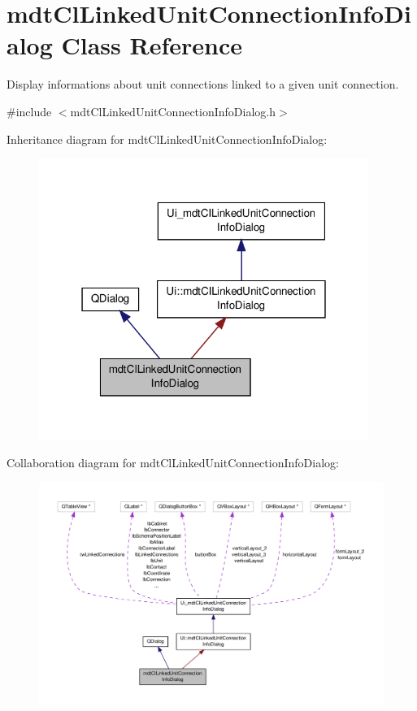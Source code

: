 \hypertarget{classmdt_cl_linked_unit_connection_info_dialog}{\section{mdt\-Cl\-Linked\-Unit\-Connection\-Info\-Dialog Class Reference}
\label{classmdt_cl_linked_unit_connection_info_dialog}
}


Display informations about unit connections linked to a given unit connection.  




{\ttfamily \#include $<$mdt\-Cl\-Linked\-Unit\-Connection\-Info\-Dialog.\-h$>$}



Inheritance diagram for mdt\-Cl\-Linked\-Unit\-Connection\-Info\-Dialog\-:\nopagebreak
\begin{figure}[H]
\begin{center}
\leavevmode
\includegraphics[width=304pt]{classmdt_cl_linked_unit_connection_info_dialog__inherit__graph}
\end{center}
\end{figure}


Collaboration diagram for mdt\-Cl\-Linked\-Unit\-Connection\-Info\-Dialog\-:\nopagebreak
\begin{figure}[H]
\begin{center}
\leavevmode
\includegraphics[width=350pt]{classmdt_cl_linked_unit_connection_info_dialog__coll__graph}
\end{center}
\end{figure}
